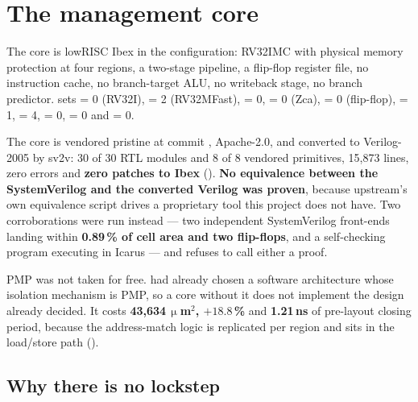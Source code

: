 \section{The management core}

\begin{sloppypar}
The core is lowRISC Ibex in the  configuration: RV32IMC
with physical memory protection at four regions, a two-stage pipeline, a
flip-flop register file, no instruction cache, no branch-target ALU, no
writeback stage, no branch predictor.  sets
 = 0 (RV32I),  = 2 (RV32MFast),
 = 0,  = 0 (Zca),  = 0
(flip-flop),  = 1,  = 4,
 = 0,  = 0 and
 = 0.
\end{sloppypar}

\begin{sloppypar}
The core is vendored pristine at commit
, Apache-2.0, and
converted to Verilog-2005 by sv2v: 30 of 30 RTL modules and 8 of 8
vendored primitives, 15{,}873 lines, zero errors and \textbf{zero patches
to Ibex} (). \textbf{No equivalence between
the SystemVerilog and the converted Verilog was proven}, because
upstream's own equivalence script drives a proprietary tool this project
does not have. Two corroborations were run instead --- two independent SystemVerilog
front-ends landing within \textbf{0.89\,\% of cell area and two
flip-flops}, and a self-checking program executing in Icarus --- and
 refuses to call either a proof.
\end{sloppypar}

\begin{sloppypar}
PMP was not taken for free.  had already chosen
a software architecture whose isolation mechanism is PMP, so a core
without it does not implement the design already decided. It costs
\textbf{43{,}634\,$\upmu$m$^2$, $+18.8$\,\%} and \textbf{1.21\,ns} of
pre-layout closing period, because the address-match logic is replicated
per region and sits in the load/store path
().
\end{sloppypar}

\subsection{Why there is no lockstep}

